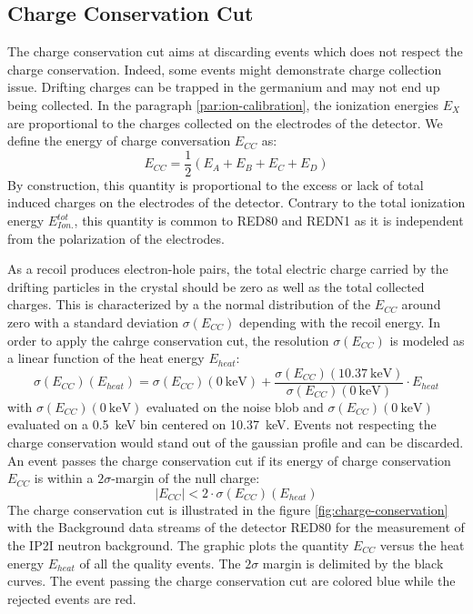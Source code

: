 \subsection{Charge Conservation Cut}
\label{par:charge-conservation-cut}

The charge conservation cut aims at discarding events which does not respect the charge conservation. Indeed, some events might demonstrate charge collection issue. Drifting charges can be trapped in the germanium and may not end up being collected. In the paragraph \ref{par:ion-calibration}, the ionization energies $E_X$ are proportional to the charges collected on the electrodes of the detector. We define the energy of charge conversation $E_{CC}$ as:
\begin{equation}
E_{CC} = \frac{1}{2} \left( E_A + E_B + E_C + E_D \right)
\end{equation}
By construction, this quantity is proportional to the excess or lack of total induced charges on the electrodes of the detector. Contrary to the total ionization energy $E_{Ion.}^{tot}$, this quantity is common to RED80 and REDN1  as it is independent from the polarization of the electrodes.

As a recoil produces electron-hole pairs, the total electric charge carried by the drifting particles in the crystal should be zero as well as the total collected charges. This is characterized by a the normal distribution of the $E_{CC}$ around zero with a standard deviation $\sigma(E_{CC})$ depending with the recoil energy. In order to apply the cahrge conservation cut, the resolution $\sigma(E_{CC})$ is modeled as a linear function of the heat energy $E_{heat}$:
\begin{equation}
\sigma(E_{CC})(E_{heat})
=
\sigma(E_{CC})(\SI{0}{\kilo\eV}) + \frac{\sigma(E_{CC})(\SI{10.37}{\kilo\eV})}{\sigma(E_{CC})(\SI{0}{\kilo\eV})} \cdot E_{heat}
\end{equation}
with $\sigma(E_{CC})(\SI{0}{\kilo\eV})$ evaluated on the noise blob and $\sigma(E_{CC})(\SI{0}{\kilo\eV})$ evaluated on a \SI{0.5}{\kilo\eV} bin centered on \SI{10.37}{\kilo\eV}.
Events not respecting the charge conservation would stand out of the gaussian profile and can be discarded. An event passes the charge conservation cut if its energy of charge conservation $E_{CC}$ is within a $2\sigma$-margin of the null charge:
\begin{equation}
|E_{CC}| < 2 \cdot \sigma(E_{CC})(E_{heat})
\end{equation}
The charge conservation cut is illustrated in the figure \ref{fig:charge-conservation} with the Background data streams of the detector RED80 for the measurement of the IP2I neutron background. The graphic plots the quantity $E_{CC}$ versus the heat energy $E_{heat}$ of all the quality events. The $2\sigma$ margin is delimited by the black curves. The event passing the charge conservation cut are colored blue while the rejected events are red.

